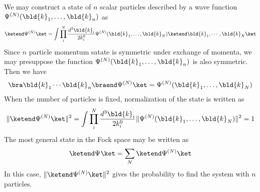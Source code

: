 We may construct a state of $n$ scalar particles described by a wave function
$\Psi^{(N)}(\bld{k}_1, \dots, \bld{k}_n)$ as
\begin{eqnarray}
\ketend \Psi^{(N)} \ket
=
\int \prod_i^N 
\frac{d^3 \bld{k}_i}{2 k_i^0}
 \Psi^{(N)} (\bld{k}_1,\dots,\bld{k}_N) 
 \ketend
 \bld{k}_1,\cdots,\bld{k}_N
\ket
\label{eqn:NscalarState}
\end{eqnarray}
Since $n$ particle momentum satate is symmetric under exchange of momenta, 
we may presuppose the function $\Psi^{(N)}(\bld{k}_1, \dots, \bld{k}_n)$ is also
symmetric. Then we have
\begin{eqnarray*}
\bra  \bld{k}_1 \cdots \bld{k}_n \braend
\Psi^{(N)} \ket
= 
 \Psi^{(N)} (\bld{k}_1,\dots,\bld{k}_N) 
 \end{eqnarray*}
When the number of particles is fixed, normalization of the state  is written as
\begin{eqnarray*}
\| \ketend \Psi^{(N)} \ket \|^2
=
\int \prod_i^N 
\frac{d^3 \bld{k}_i}{2 k_i^0}
\| \Psi^{(N)} (\bld{k}_1,\dots,\bld{k}_N) \|^2
=
1
\end{eqnarray*}
The most general state 
in the Fock space
may be written as
\begin{equation*}
\ketend \Psi^{} \ket
=
\sum_N
\ketend \Psi^{(N)} \ket
\end{equation*}
In this case, $\| \ketend \Psi^{(N)} \ket \|^2$
gives the probability to find the system 
with $n$ particles.

